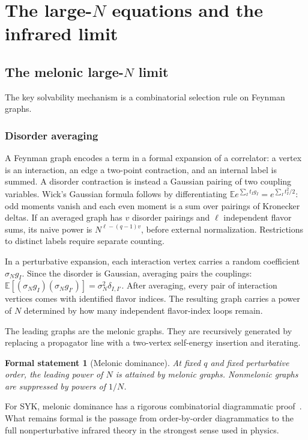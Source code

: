 \documentclass[11pt]{article}
\numberwithin{equation}{section}
\theoremstyle{exposition}
\newtheorem{heuristic}[definition]{Formal statement}
\theoremstyle{result}
\newcommand{\E}{\mathbb E}
\begin{document}
\section[Large-N and infrared theory]{The large-$N$ equations and the infrared limit}\label{sec:largeN}

\subsection[The melonic large-N limit]{The melonic large-$N$ limit}

The key solvability mechanism is a combinatorial selection rule on Feynman graphs.

\subsubsection{Disorder averaging}


A Feynman graph encodes a term in a formal expansion of a correlator: a vertex is an interaction, an edge a two-point contraction, and an internal label is summed. A disorder contraction is instead a Gaussian pairing of two coupling variables. Wick's Gaussian formula follows by differentiating $\E e^{\sum_I t_Ig_I}=e^{\sum_I t_I^2/2}$: odd moments vanish and each even moment is a sum over pairings of Kronecker deltas. If an averaged graph has $v$ disorder pairings and $\ell$ independent flavor sums, its naive power is $N^{\ell-(q-1)v}$, before external normalization. Restrictions to distinct labels require separate counting.

In a perturbative expansion, each interaction vertex carries a random coefficient $\sigma_Ng_I$. Since the disorder is Gaussian, averaging pairs the couplings: $\E[(\sigma_Ng_I)(\sigma_Ng_{I'})] =\sigma_N^2\delta_{I,I'}$. After averaging, every pair of interaction vertices comes with identified flavor indices. The resulting graph carries a power of $N$ determined by how many independent flavor-index loops remain.

The leading graphs are the melonic graphs. They are recursively generated by replacing a propagator line with a two-vertex self-energy insertion and iterating.

\begin{heuristic}[Melonic dominance]
At fixed $q$ and fixed perturbative order, the leading power of $N$ is attained by melonic graphs. Nonmelonic graphs are suppressed by powers of $1/N$.
\end{heuristic}

For SYK, melonic dominance has a rigorous combinatorial diagrammatic proof~\cite{Bonzom}. What remains formal is the passage from order-by-order diagrammatics to the full nonperturbative infrared theory in the strongest sense used in physics.
\end{document}
